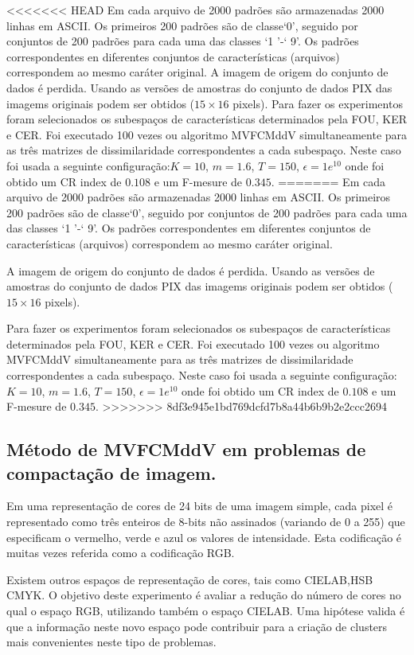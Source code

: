 \documentclass[12pt]{article}
\begin{document}
<<<<<<< HEAD
Em cada arquivo de 2000 padrões são armazenadas 2000 linhas em ASCII. Os primeiros 200 padrões são de classe`0', seguido por conjuntos de 200 padrões para cada uma das classes `1 '-` 9'. Os padrões correspondentes en diferentes conjuntos de características (arquivos) correspondem ao mesmo caráter original.
A imagem de origem do conjunto de dados é perdida. Usando as versões de amostras  do conjunto de dados PIX das imagems originais podem ser obtidos ($15 \times 16$ pixels).
Para fazer os experimentos foram selecionados os subespaços de características determinados pela FOU, KER e CER. Foi executado 100 vezes ou algoritmo MVFCMddV simultaneamente para as três matrizes de dissimilaridade correspondentes a cada subespaço. Neste caso foi usada a seguinte configuração:$K =10$, $m = 1.6$, $T = 150$, $\epsilon = 1e^{10}$ onde foi obtido um CR index de $0.108$ e um F-mesure de $0.345$. 
=======
Em cada arquivo de 2000 padrões são armazenadas 2000 linhas em ASCII. Os primeiros 200 padrões são de classe`0', seguido por conjuntos de 200 padrões para cada uma das classes `1 '-` 9'. Os padrões correspondentes em diferentes conjuntos de características (arquivos) correspondem ao mesmo caráter original.

A imagem de origem do conjunto de dados é perdida.
Usando as versões de amostras  do conjunto de dados PIX das imagems originais podem ser obtidos ($15 \times 16$ pixels).

Para fazer os experimentos foram selecionados os subespaços de características determinados pela FOU, KER e CER. Foi executado 100 vezes ou algoritmo MVFCMddV simultaneamente para as três matrizes de dissimilaridade correspondentes a cada subespaço. Neste caso foi usada a seguinte configuração: $K =10$, $m = 1.6$, $T = 150$, $\epsilon = 1e^{10}$ onde foi obtido um CR index de $0.108$ e um F-mesure de $0.345$. 
>>>>>>> 8df3e945e1bd769dcfd7b8a44b6b9b2e2ccc2694

\subsection{Método de MVFCMddV em problemas de compactação de imagem.}

Em uma representação de cores de 24 bits de uma imagem simple, cada pixel é representado como três enteiros de 8-bits não assinados (variando de 0 a 255) que especificam o vermelho, verde e azul os valores de intensidade. Esta codificação é muitas vezes referida como a codificação RGB.

Existem outros espaços de representação de cores, tais como CIELAB,HSB CMYK. O objetivo deste experimento é avaliar a redução do número de cores no qual o espaço RGB, utilizando também o espaço CIELAB. Uma hipótese valida é que a informação neste novo espaço pode contribuir para a criação de clusters mais convenientes neste tipo de problemas.
\end{document}
